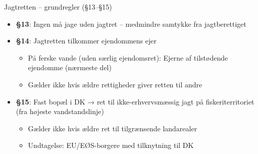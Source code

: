 \begin{frame}{Jagtretten – grundregler (§13–§15)}
    \begin{itemize}
        \item \textbf{§13}: Ingen må jage uden jagtret – medmindre samtykke fra jagtberettiget
        \item \textbf{§14}: Jagtretten tilkommer ejendommens ejer
          \begin{itemize}
            \item På ferske vande (uden særlig ejendomsret): Ejerne af tilstødende ejendomme (nærmeste del)
            \item Gælder ikke hvis ældre rettigheder giver retten til andre
          \end{itemize}
        \item \textbf{§15}: Fast bopæl i DK → ret til ikke-erhvervsmæssig jagt på fiskeriterritoriet (fra højeste vandstandslinje)
          \begin{itemize}
            \item Gælder ikke hvis ældre ret til tilgrænsende landarealer
            \item Undtagelse: EU/EØS-borgere med tilknytning til DK
          \end{itemize}
    \end{itemize}
\end{frame}